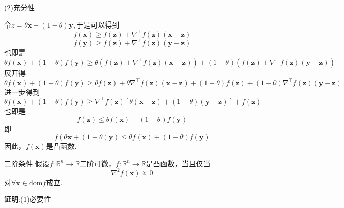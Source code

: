 (2)充分性

令$z=\theta\boldsymbol{x}+(1-\theta)\boldsymbol{y},$于是可以得到
$$
f\left( \boldsymbol{x} \right) \geqslant f\left( \boldsymbol{z} \right) +\nabla ^{\top}f\left( \boldsymbol{z} \right) \left( \boldsymbol{x}-\boldsymbol{z} \right)~
$$
$$
f\left( \boldsymbol{y} \right) \geqslant f\left( \boldsymbol{z} \right) +\nabla ^{\top}f\left( \boldsymbol{z} \right) \left( \boldsymbol{y}-\boldsymbol{z} \right)~
$$
也即是
$$
\theta f\left( \boldsymbol{x} \right) +\left( 1-\theta \right) f\left( \boldsymbol{y} \right) \geqslant \theta \left( f\left( \boldsymbol{z} \right) +\nabla ^{\top}f\left( \boldsymbol{z} \right) \left( \boldsymbol{x}-\boldsymbol{z} \right) \right) +\left( 1-\theta \right) \left( f\left( \boldsymbol{z} \right) +\nabla ^{\top}f\left( \boldsymbol{z} \right) \left( \boldsymbol{y}-\boldsymbol{z} \right) \right)~
$$
展开得
$$
\theta f\left( \boldsymbol{x} \right) +\left( 1-\theta \right) f\left( \boldsymbol{y} \right) \geqslant \theta f\left( \boldsymbol{z} \right) +\theta \nabla ^{\top}f\left( \boldsymbol{z} \right) \left( \boldsymbol{x}-\boldsymbol{z} \right) +\left( 1-\theta \right) f\left( \boldsymbol{z} \right) +\left( 1-\theta \right) \nabla ^{\top}f\left( \boldsymbol{z} \right) \left( \boldsymbol{y}-\boldsymbol{z} \right)~
$$
进一步得到
$$
\theta f\left( \boldsymbol{x} \right) +\left( 1-\theta \right) f\left( \boldsymbol{y} \right) \geqslant \nabla ^{\top}f\left( \boldsymbol{z} \right) \left[ \theta \left( \boldsymbol{x}-\boldsymbol{z} \right) +\left( 1-\theta \right) \left( \boldsymbol{y}-\boldsymbol{z} \right) \right] +f\left( \boldsymbol{z} \right)~
$$
也即是
$$
f\left( \boldsymbol{z} \right) \leqslant \theta f\left( \boldsymbol{x} \right) +\left( 1-\theta \right) f\left( \boldsymbol{y} \right)~
$$
即
$$
f\left( \theta \boldsymbol{x}+\left( 1-\theta \right) \boldsymbol{y} \right) \leqslant \theta f\left( \boldsymbol{x} \right) +\left( 1-\theta \right) f\left( \boldsymbol{y} \right)~
$$
因此，$f(\boldsymbol{x})$是凸函数.

\begin{theorem}{二阶条件}
假设$f:\mathbb{R}^n\to\mathbb{R}$二阶可微，$f:\mathbb{R}^n\to\mathbb{R}$是凸函数，当且仅当
\begin{equation}
\nabla^2 f(\boldsymbol{x})\succeq 0~
\end{equation}
对$\forall\boldsymbol{x}\in\mathrm{dom} f$成立.
\end{theorem}
\textbf{证明}:(1)必要性

